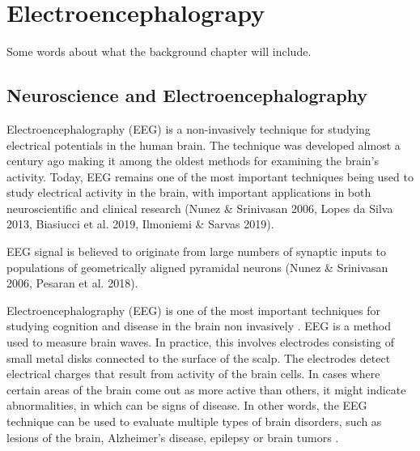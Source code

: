 \documentclass[a4paper, UKenglish, 11pt]{uiomaster}
\begin{document}
\chapter{Electroencephalograpy}
Some words about what the background chapter will include.

\section{Neuroscience and Electroencephalography}

Electroencephalography (EEG) is a non-invasively technique for studying electrical potentials in the human brain. The technique was developed almost a century ago making it among the oldest methods for examining the brain's activity. Today, EEG remains one of the most important techniques being used to study electrical activity in the brain, with important applications in both neuroscientific and clinical research (Nunez & Srinivasan 2006, Lopes da Silva 2013, Biasiucci et al. 2019, Ilmoniemi & Sarvas 2019).

EEG signal is believed to originate from large numbers of synaptic inputs to populations of geometrically aligned pyramidal neurons (Nunez & Srinivasan 2006, Pesaran et al. 2018).

Electroencephalography (EEG) is one of the most important techniques for studying cognition and disease in the brain non invasively \cite{95}. EEG is a method used to measure brain waves. In practice, this involves electrodes consisting of small metal disks connected to the surface of the scalp. The electrodes detect electrical charges that result from activity of the brain cells. In cases where certain areas of the brain come out as more active than others, it might indicate abnormalities, in which can be signs of disease. In other words, the EEG technique can be used to evaluate multiple types of brain disorders, such as lesions of the brain, Alzheimer's disease, epilepsy or brain tumors \cite{96}.
\end{document}
